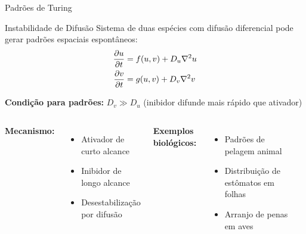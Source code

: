 \begin{frame}{Padrões de Turing}
\begin{block}{Instabilidade de Difusão}
Sistema de duas espécies com difusão diferencial pode gerar padrões espaciais espontâneos:
\begin{align*}
\frac{\partial u}{\partial t} &= f(u,v) + D_u \nabla^2 u\\
\frac{\partial v}{\partial t} &= g(u,v) + D_v \nabla^2 v
\end{align*}

\textbf{Condição para padrões:} $D_v \gg D_u$ (inibidor difunde mais rápido que ativador)
\end{block}

\begin{columns}
\textbf{Mecanismo:}
\begin{itemize}
    \item Ativador de curto alcance
    \item Inibidor de longo alcance
    \item Desestabilização por difusão
\end{itemize}

\textbf{Exemplos biológicos:}
\begin{itemize}
    \item Padrões de pelagem animal
    \item Distribuição de estômatos em folhas
    \item Arranjo de penas em aves
\end{itemize}

\begin{center}
\end{center}
\end{columns}

\end{frame}

